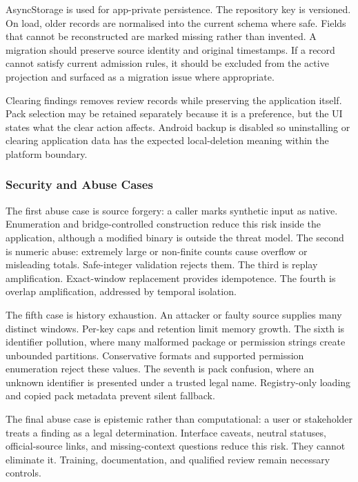 AsyncStorage is used for app-private persistence. The repository key is versioned. On load, older records are normalised into the current schema where safe. Fields that cannot be reconstructed are marked missing rather than invented. A migration should preserve source identity and original timestamps. If a record cannot satisfy current admission rules, it should be excluded from the active projection and surfaced as a migration issue where appropriate.

Clearing findings removes review records while preserving the application itself. Pack selection may be retained separately because it is a preference, but the UI states what the clear action affects. Android backup is disabled so uninstalling or clearing application data has the expected local-deletion meaning within the platform boundary.

\subsubsection{Security and Abuse Cases}

The first abuse case is source forgery: a caller marks synthetic input as native. Enumeration and bridge-controlled construction reduce this risk inside the application, although a modified binary is outside the threat model. The second is numeric abuse: extremely large or non-finite counts cause overflow or misleading totals. Safe-integer validation rejects them. The third is replay amplification. Exact-window replacement provides idempotence. The fourth is overlap amplification, addressed by temporal isolation.

The fifth case is history exhaustion. An attacker or faulty source supplies many distinct windows. Per-key caps and retention limit memory growth. The sixth is identifier pollution, where many malformed package or permission strings create unbounded partitions. Conservative formats and supported permission enumeration reject these values. The seventh is pack confusion, where an unknown identifier is presented under a trusted legal name. Registry-only loading and copied pack metadata prevent silent fallback.

The final abuse case is epistemic rather than computational: a user or stakeholder treats a finding as a legal determination. Interface caveats, neutral statuses, official-source links, and missing-context questions reduce this risk. They cannot eliminate it. Training, documentation, and qualified review remain necessary controls.

